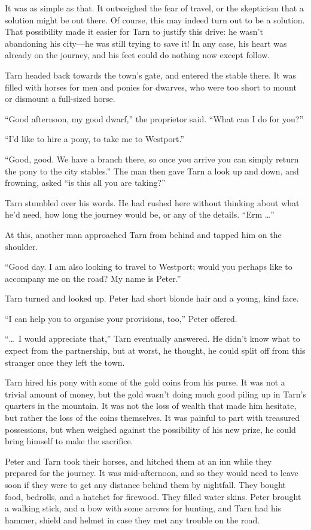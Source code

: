 It was as simple as that.  It outweighed the fear of travel, or the skepticism that a solution might be out there.  Of course, this may indeed turn out to be a solution.  That possibility made it easier for Tarn to justify this drive: he wasn't abandoning his city---he was still trying to save it!  In any case, his heart was already on the journey, and his feet could do nothing now except follow.

Tarn headed back towards the town's gate, and entered the stable there.  It was filled with horses for men and ponies for dwarves, who were too short to mount or dismount a full-sized horse.

``Good afternoon, my good dwarf,'' the proprietor said.  ``What can I do for you?''

``I'd like to hire a pony, to take me to Westport.''

``Good, good.  We have a branch there, so once you arrive you can simply return the pony to the city stables.''  The man then gave Tarn a look up and down, and frowning, asked ``is this all you are taking?''

Tarn stumbled over his words.  He had rushed here without thinking about what he'd need, how long the journey would be, or any of the details.  ``Erm \ldots''

At this, another man approached Tarn from behind and tapped him on the shoulder.

``Good day.  I am also looking to travel to Westport; would you perhaps like to accompany me on the road?  My name is Peter.''

Tarn turned and looked up.  Peter had short blonde hair and a young, kind face.

``I can help you to organise your provisions, too,'' Peter offered.

``\ldots\ I would appreciate that,'' Tarn eventually answered.  He didn't know what to expect from the partnership, but at worst, he thought, he could split off from this stranger once they left the town.

Tarn hired his pony with some of the gold coins from his purse.  It was not a trivial amount of money, but the gold wasn't doing much good piling up in Tarn's quarters in the mountain.  It was not the loss of wealth that made him hesitate, but rather the loss of the coins themselves.  It was painful to part with treasured possessions, but when weighed against the possibility of his new prize, he could bring himself to make the sacrifice.

Peter and Tarn took their horses, and hitched them at an inn while they prepared for the journey.  It was mid-afternoon, and so they would need to leave soon if they were to get any distance behind them by nightfall.  They bought food, bedrolls, and a hatchet for firewood. They filled water skins.  Peter brought a walking stick, and a bow with some arrows for hunting, and Tarn had his hammer, shield and helmet in case they met any trouble on the road.

